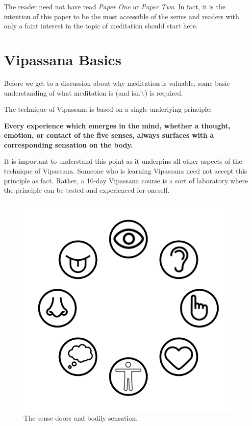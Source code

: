 \documentclass[a4paper, amsfonts, amssymb, amsmath, reprint, showkeys, nofootinbib, twoside]{revtex4-1}
\begin{document}
The reader need not have read \textit{Paper One} or \textit{Paper Two}. In fact, it
is the intention of this paper to be the most accessible of the series and readers
with only a faint interest in the topic of meditation should start here.


\section{Vipassana Basics}

Before we get to a discussion about why meditation is valuable, some basic
understanding of what meditation is (and isn't) is required.

The technique of Vipassana is based on a single underlying principle:

\vspace{1cm}
\textbf{Every experience which emerges in the mind, whether a thought, emotion, or contact of the five senses, always surfaces with a corresponding sensation on the body.}
\vspace{1cm}

It is important to understand this point as it underpins all other aspects of the
technique of Vipassana. Someone who is learning Vipassana need not accept this
principle as fact. Rather, a 10-day Vipassana course is a sort of laboratory where the
principle can be tested and experienced for oneself.

\begin{figure}[H]
  \centering
  \includegraphics[width=0.8\linewidth]{images/sense-doors.png}
  \caption{The sense doors and bodily sensation. \cite{sense-icons}}
  \label{fig:sense-doors}
\end{figure}
\end{document}
